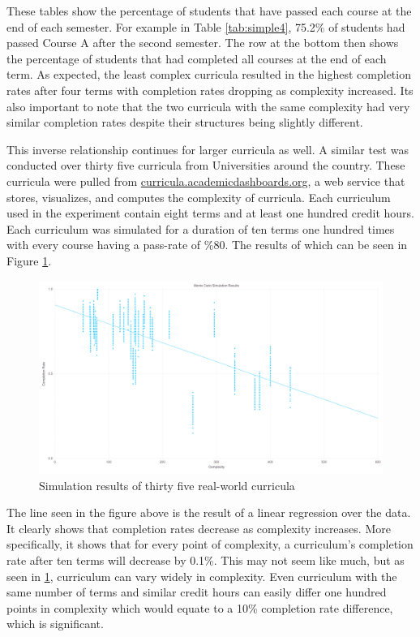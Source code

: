 \documentclass[botnum, fleqn]{unmeethesis}
\begin{document}
These tables show the percentage of students that have passed each course at the end of each semester. For example in Table \ref{tab:simple4}, 75.2\% of students had passed Course A after the second semester. The row at the bottom then shows the percentage of students that had completed all courses at the end of each term. As expected, the least complex curricula resulted in the highest completion rates after four terms with completion rates dropping as complexity increased. Its also important to note that the two curricula with the same complexity had very similar completion rates despite their structures being slightly different.

This inverse relationship continues for larger curricula as well. A similar test was conducted over thirty five curricula from Universities around the country. These curricula were pulled from \href{http://curricula.academicdashboards.org}{curricula.academicdashboards.org}, a web service that stores, visualizes, and computes the complexity of curricula. Each curriculum used in the experiment contain eight terms and at least one hundred credit hours. Each curriculum was simulated for a duration of ten terms one hundred times with every course having a pass-rate of \%80. The results of which can be seen in Figure \ref{fig:monte_web}.

\begin{figure}[h!]
\centerline{\includegraphics[scale=0.2]{./figures/monteCarloEight.png}}
\caption{Simulation results of thirty five real-world curricula} 
\label{fig:monte_web}
\end{figure}

The line seen in the figure above is the result of a linear regression over the data. It clearly shows that completion rates decrease as complexity increases. More specifically, it shows that for every point of complexity, a curriculum's completion rate after ten terms will decrease by 0.1\%. This may not seem like much, but as seen in \ref{fig:monte_web}, curriculum can vary widely in complexity. Even curriculum with the same number of terms and similar credit hours can easily differ one hundred points in complexity which would equate to a 10\% completion rate difference, which is significant.
\end{document}
